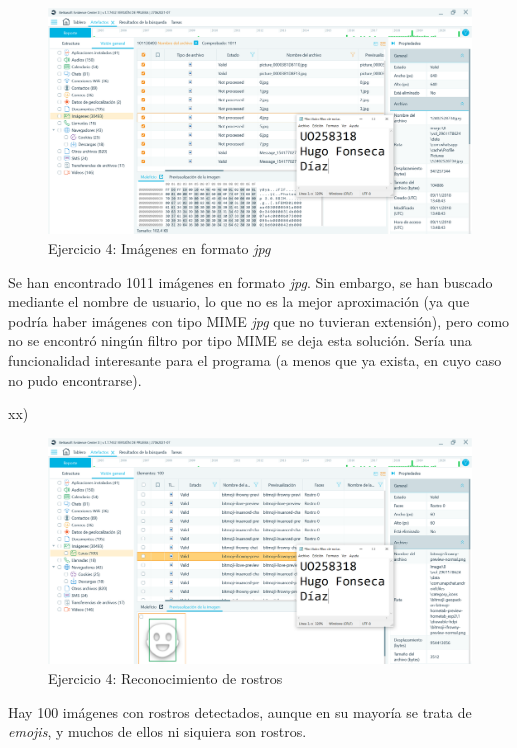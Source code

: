 \documentclass[11pt]{article}
\begin{document}
\begin{figure}[H]
    \caption{Ejercicio 4: Imágenes en formato \textit{jpg}}
    \centering
    \includegraphics[scale=0.4]{p04/e7-14.PNG}
\end{figure}

Se han encontrado 1011 imágenes en formato \textit{jpg}. Sin embargo, se han buscado mediante el nombre de usuario, lo que no es la mejor aproximación (ya que podría haber imágenes con tipo MIME \textit{jpg} que no tuvieran extensión), pero como no se encontró ningún filtro por tipo MIME se deja esta solución. Sería una funcionalidad interesante para el programa (a menos que ya exista, en cuyo caso no pudo encontrarse).

xx)

\begin{figure}[H]
    \caption{Ejercicio 4: Reconocimiento de rostros}
    \centering
    \includegraphics[scale=0.4]{p04/e7-15.PNG}
\end{figure}

Hay 100 imágenes con rostros detectados, aunque en su mayoría se trata de \textit{emojis}, y muchos de ellos ni siquiera son rostros.
\end{document}
